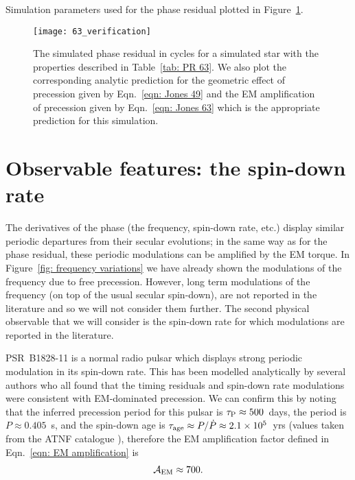 \documentclass[../full_thesis/full_thesis.tex]{subfiles}
\newcommand{\thisdir}{../inertial_frame}
\begin{document}
\begin{table}[htb]
\centering

\caption{Simulation parameters used for the phase residual plotted in
Figure~\ref{fig: PR 63}.}
\label{tab: PR 63}
\end{table}

\begin{figure}[htb]
\centering
\texttt{[image: 63\_verification]}
\caption{The simulated phase residual in cycles for a simulated star with the
properties described in Table~\ref{tab: PR 63}. We also plot the corresponding
analytic prediction for the geometric effect of precession given by
 Eqn.~\eqref{eqn: Jones 49} and the EM amplification of precession given by
Eqn.~\eqref{eqn: Jones 63} which is the appropriate prediction for this simulation.}
\label{fig: PR 63}
\end{figure}

\section{Observable features: the spin-down rate}
\label{sec: observable features: spin-down rate}

The derivatives of the phase (the frequency, spin-down rate, etc.) display
similar periodic departures from their secular evolutions; in the same way as
for the phase residual, these periodic modulations can be amplified by the
EM torque. In Figure~\ref{fig: frequency variations} we have already shown
the modulations of the frequency due to free precession. However,
long term modulations of the frequency (on top of the usual secular spin-down),
are not reported in the literature and so we will not consider them further.
The second physical observable that we will consider is the spin-down rate
for which modulations are reported in the literature.

PSR~B1828-11 is a normal radio pulsar which displays strong periodic modulation
in its spin-down rate. This has been modelled analytically by several authors
\citep{Stairs2000, Jones2001, Link2001, Akgun2006} who all found that the timing
residuals and spin-down rate modulations were consistent with EM-dominated
precession. We can confirm this by noting that the inferred precession period for this
pulsar is $\tau_{\mathrm{P}} \approx 500$~days, the period is $P\approx0.405$~s, and
the spin-down age is $\tau_{\mathrm{age}} \approx P/\dot{P} \approx 2.1 \times10^{5}$~yrs (values
taken from the ATNF catalogue \citet{ATNF}), therefore the EM amplification factor
defined in Eqn.~\eqref{eqn: EM amplification} is
\begin{align}
\mathcal{A}_{\mathrm{EM}} \approx 700.
\end{align}
\end{document}
